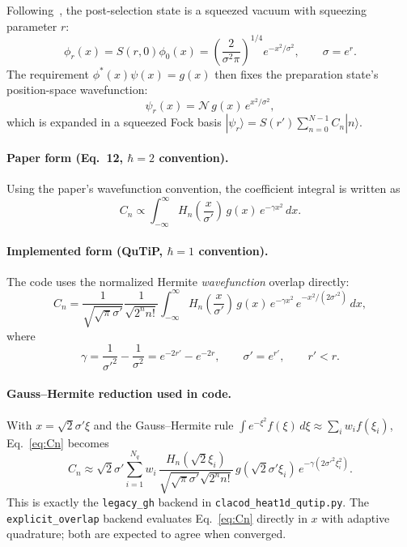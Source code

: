 \documentclass[11pt]{article}
\begin{document}
Following~\cite{das2025}, the post-selection state is a squeezed vacuum
with squeezing parameter $r$:
\begin{equation}\label{eq:phi}
  \phi_r(x) = S(r,0)\phi_0(x) =
  \left(\frac{2}{\sigma^2\pi}\right)^{1/4} e^{-x^2/\sigma^2},
  \qquad \sigma = e^r.
\end{equation}
The requirement $\phi^*(x)\psi(x) = g(x)$ then fixes the preparation state's
position-space wavefunction:
\begin{equation}\label{eq:psi}
  \psi_r(x) = \mathcal{N}\,g(x)\,e^{x^2/\sigma^2},
\end{equation}
which is expanded in a squeezed Fock basis
$|\psi_r\rangle = S(r')\sum_{n=0}^{N-1} C_n|n\rangle$.

\paragraph{Paper form (Eq.~12, $\hbar=2$ convention).}
Using the paper's wavefunction convention, the coefficient integral is written as
\begin{equation}\label{eq:Cn-paper}
  C_n \propto
  \int_{-\infty}^{\infty}
  H_n\!\left(\frac{x}{\sigma'}\right)\,
  g(x)\,e^{-\gamma x^2}\,dx .
\end{equation}

\paragraph{Implemented form (QuTiP, $\hbar=1$ convention).}
The code uses the normalized Hermite \emph{wavefunction} overlap directly:
\begin{equation}\label{eq:Cn}
  C_n =
  \frac{1}{\sqrt{\sqrt{\pi}\sigma'}}\frac{1}{\sqrt{2^n n!}}
  \int_{-\infty}^{\infty}
  H_n\!\left(\frac{x}{\sigma'}\right)\,
  g(x)\,e^{-\gamma x^2}\,e^{-x^2/(2\sigma'^2)}\,dx ,
\end{equation}
where
\begin{equation}\label{eq:gamma}
  \gamma = \frac{1}{\sigma'^2} - \frac{1}{\sigma^2}
  = e^{-2r'} - e^{-2r}, \qquad \sigma' = e^{r'}, \qquad r' < r.
\end{equation}

\paragraph{Gauss--Hermite reduction used in code.}
With $x=\sqrt{2}\sigma'\xi$ and the Gauss--Hermite rule
$\int e^{-\xi^2}f(\xi)\,d\xi \approx \sum_i w_i f(\xi_i)$, Eq.~\eqref{eq:Cn}
becomes
\begin{equation}\label{eq:Cn-gh}
  C_n \approx
  \sqrt{2}\sigma'
  \sum_{i=1}^{N_q}
  w_i\,
  \frac{H_n(\sqrt{2}\xi_i)}{\sqrt{\sqrt{\pi}\sigma'}\sqrt{2^n n!}}\,
  g(\sqrt{2}\sigma'\xi_i)\,
  e^{-\gamma(2\sigma'^2\xi_i^2)} .
\end{equation}
This is exactly the \texttt{legacy\_gh} backend in
\texttt{clacod\_heat1d\_qutip.py}.  The \texttt{explicit\_overlap} backend
evaluates Eq.~\eqref{eq:Cn} directly in $x$ with adaptive quadrature; both are
expected to agree when converged.
\end{document}

